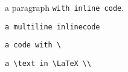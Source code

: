 a paragraph \texttt{with inline code}.

\texttt{a
multiline
inlinecode}

\texttt{a code with \textbackslash{}}

\texttt{a \textbackslash{}text in \textbackslash{}LaTeX \textbackslash{}\textbackslash{}}
